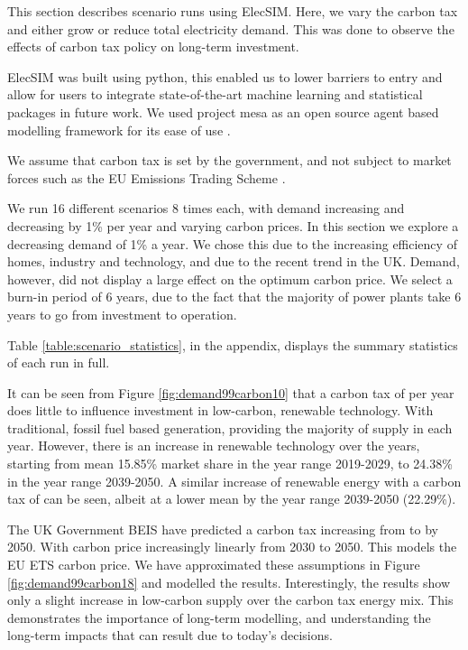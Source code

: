 
This section describes scenario runs using ElecSIM. Here, we vary the carbon tax and either grow or reduce total electricity demand. This was done to observe the effects of carbon tax policy on long-term investment.

ElecSIM was built using python, this enabled us to lower barriers to entry and allow for users to integrate state-of-the-art machine learning and statistical packages in future work. We used project mesa as an open source agent based modelling framework for its ease of use \cite{Masad2015}.

We assume that carbon tax is set by the government, and not subject to market forces such as the EU Emissions Trading Scheme \cite{Council2016}.

We run 16 different scenarios 8 times each, with demand increasing and decreasing by 1\% per year and  varying carbon prices. In this section we explore a decreasing demand of 1\% a year. We chose this due to the increasing efficiency of homes, industry and technology, and due to the recent trend in the UK. Demand, however, did not display a large effect on the optimum carbon price. We select a burn-in period of 6 years, due to the fact that the majority of power plants take 6 years to go from investment to operation.

Table \ref{table:scenario_statistics}, in the appendix, displays the summary statistics of each run in full.

It can be seen from Figure \ref{fig:demand99carbon10} that a carbon tax of  per year does little to influence investment in low-carbon, renewable technology. With traditional, fossil fuel based generation, providing the majority of supply in each year. However, there is an increase in renewable technology over the years, starting from mean 15.85\% market share in the year range 2019-2029, to 24.38\% in the year range 2039-2050. A similar increase of renewable energy with a carbon tax of  can be seen, albeit at a lower mean by the year range 2039-2050 (22.29\%).

The UK Government BEIS have predicted a carbon tax increasing from  to  by 2050. With carbon price increasingly linearly from 2030 to 2050. This models the EU ETS carbon price. We have approximated these assumptions in Figure \ref{fig:demand99carbon18} and modelled the results. Interestingly, the results show only a slight increase in low-carbon supply over the  carbon tax energy mix. This demonstrates the importance of long-term modelling, and understanding the long-term impacts that can result due to today's decisions.

